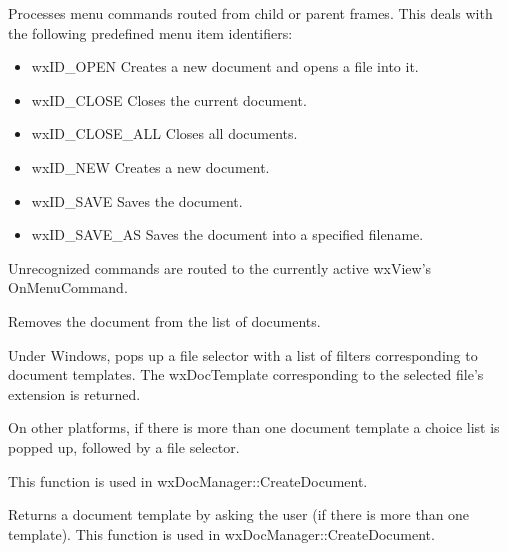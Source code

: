 Processes menu commands routed from child or parent frames. This deals
with the following predefined menu item identifiers:

\begin{itemize}\itemsep=0pt
\item wxID\_OPEN Creates a new document and opens a file into it.
\item wxID\_CLOSE Closes the current document.
\item wxID\_CLOSE\_ALL Closes all documents.
\item wxID\_NEW Creates a new document.
\item wxID\_SAVE Saves the document.
\item wxID\_SAVE\_AS Saves the document into a specified filename.
\end{itemize}

Unrecognized commands are routed to the currently active wxView's OnMenuCommand.



Removes the document from the list of documents.



Under Windows, pops up a file selector with a list of filters corresponding to document templates.
The wxDocTemplate corresponding to the selected file's extension is returned.

On other platforms, if there is more than one document template a choice list is popped up,
followed by a file selector.

This function is used in wxDocManager::CreateDocument.



Returns a document template by asking the user (if there is more than one template).
This function is used in wxDocManager::CreateDocument.


